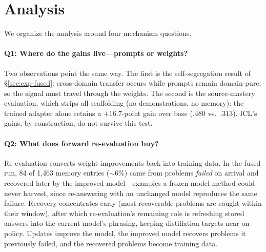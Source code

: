 \section{Analysis}
\label{sec:analysis}

We organize the analysis around four mechanism questions.

\paragraph{Q1: Where do the gains live---prompts or weights?}
Two observations point the same way. The first is the self-segregation
result of \S\ref{sec:exp-fused}: cross-domain transfer occurs while prompts
remain domain-pure, so the signal must travel through the weights. The second
is the source-mastery evaluation, which strips all scaffolding (no
demonstrations, no memory): the trained adapter alone retains a $+16.7$-point
gain over base ($.480$ vs.\ $.313$). ICL's gains, by construction, do not
survive this test.


\paragraph{Q2: What does forward re-evaluation buy?}
Re-evaluation converts weight improvements back into training data. In the fused
run, 84 of 1{,}463 memory entries (${\sim}6\%$) came from problems \emph{failed}
on arrival and recovered later by the improved model---examples a frozen-model
method could never harvest, since re-answering with an unchanged model
reproduces the same failure. Recovery concentrates early (most recoverable
problems are caught within their window), after which re-evaluation's remaining
role is refreshing stored answers into the current model's phrasing, keeping
distillation targets near on-policy. Updates improve the model, the improved model recovers problems it
previously failed, and the recovered problems become training data.

